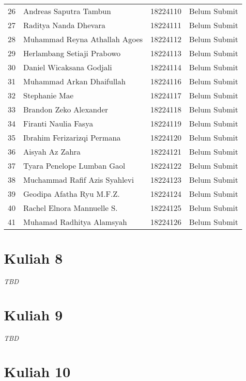 \documentclass[
  letterpaper,
  DIV=11,
  numbers=noendperiod]{scrreprt}
\begin{document}
\begin{longtable}[]{@{}llll@{}}
26 & Andreas Saputra Tambun & 18224110 & Belum Submit \\
27 & Raditya Nanda Dhevara & 18224111 & Belum Submit \\
28 & Muhammad Reyna Athallah Agoes & 18224112 & Belum Submit \\
29 & Herlambang Setiaji Prabowo & 18224113 & Belum Submit \\
30 & Daniel Wicaksana Godjali & 18224114 & Belum Submit \\
31 & Muhammad Arkan Dhaifullah & 18224116 & Belum Submit \\
32 & Stephanie Mae & 18224117 & Belum Submit \\
33 & Brandon Zeko Alexander & 18224118 & Belum Submit \\
34 & Firanti Naulia Fasya & 18224119 & Belum Submit \\
35 & Ibrahim Ferizarizqi Permana & 18224120 & Belum Submit \\
36 & Aisyah Az Zahra & 18224121 & Belum Submit \\
37 & Tyara Penelope Lumban Gaol & 18224122 & Belum Submit \\
38 & Muchammad Rafif Azis Syahlevi & 18224123 & Belum Submit \\
39 & Geodipa Afatha Ryu M.F.Z. & 18224124 & Belum Submit \\
40 & Rachel Elnora Mannuelle S. & 18224125 & Belum Submit \\
41 & Muhamad Radhitya Alamsyah & 18224126 & Belum Submit \\
\end{longtable}


\chapter{Kuliah 8}\label{kuliah-8}

\emph{TBD}


\chapter{Kuliah 9}\label{kuliah-9}

\emph{TBD}


\chapter{Kuliah 10}\label{kuliah-10}
\end{document}

